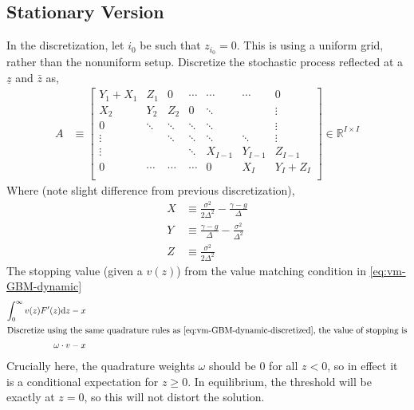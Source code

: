 \documentclass[11pt]{article}
\newcommand{\R}{\ensuremath{\mathbb{R}}}
\newcommand{\diff}{\ensuremath{\mathrm{d}}}
\begin{document}
\subsection{Stationary Version}
In the discretization, let $i_0$ be such that $z_{i_0} = 0$.  This is using a uniform grid, rather than the nonuniform setup.  Discretize the stochastic process reflected at a $\underline{z}$ and $\bar{z}$ as,
\begin{align}
	A &\equiv \begin{bmatrix}
		Y_1 + X_1 & Z_1 & 0 & \cdots & \cdots & \cdots & 0 \\
		X_2 & Y_2 & Z_2 & 0 & \ddots& & \vdots \\
		0 & \ddots & \ddots & \ddots & \ddots &  & \vdots \\
		\vdots & &\ddots & \ddots & \ddots & \ddots  & \vdots \\
		\vdots & & & \ddots & X_{I-1} & Y_{I-1}  & Z_{I-1} \\
		0 & \cdots & \cdots & \cdots & 0 & X_I & Y_I+Z_I\\
	\end{bmatrix}\in\R^{I\times I}\label{eq:A}
\end{align}
Where (note slight difference from previous discretization),
\begin{align}
	X &\equiv \frac{\sigma^2}{2\Delta^2}-\frac{\gamma - g}{\Delta}\\
	Y &\equiv \frac{\gamma - g}{\Delta}-\frac{\sigma^2}{\Delta^2}\\
	Z &\equiv \frac{\sigma^2}{2\Delta^2}
\end{align}
The stopping value (given a $v(z)$) from the value matching condition in \cref{eq:vm-GBM-dynamic}
\begin{align}
\int_{0}^{\infty} v(z) F'(z)\diff z - x\\
\intertext{Discretize using the same quadrature rules as \cref{eq:vm-GBM-dynamic-discretized}, the value of stopping is}
\omega \cdot v - x
\end{align}
Crucially here, the quadrature weights $\omega$ should be $0$ for all $z < 0$, so in effect it is a conditional expectation for $z \geq 0$.  In equilibrium, the threshold will be exactly at $z=0$, so this will not distort the solution.
	
\end{document}
